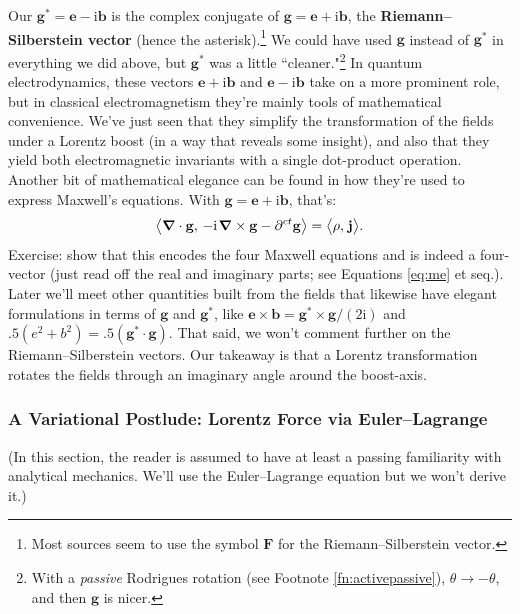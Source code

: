 \documentclass[12pt]{article}
\renewcommand{\vv}[1]{\mathbf{#1}}
\newcommand{\del}{\boldsymbol{\nabla}}
\begin{document}
Our $\vv g^{*} = \vv e - \textrm{i} \vv b$ is the complex conjugate of $\vv g = \vv e + \textrm{i} \vv b$, the \textbf{Riemann--Silberstein vector} (hence the asterisk).\footnote{Most sources seem to use the symbol $\vv F$ for the Riemann--Silberstein vector.} We could have used $\vv g$ instead of $\vv g^*$ in everything we did above, but $\vv g^*$ was a little ``cleaner."\footnote{With a \emph{passive} Rodrigues rotation (see Footnote \ref{fn:activepassive}), $\theta \rightarrow - \theta$, and then $\vv g$ is nicer.} In quantum electrodynamics, these vectors $\vv e + \textrm{i} \vv b$ and $\vv e - \textrm{i} \vv b$ take on a more prominent role, but in classical electromagnetism they're mainly tools of mathematical convenience. We've just seen that they simplify the transformation of the fields under a Lorentz boost (in a way that reveals some insight), and also that they yield both electromagnetic invariants with a single dot-product operation. Another bit of mathematical elegance can be found in how they're used to express Maxwell's equations. With $\vv g = \vv e + \textrm{i} \vv b$, that's:
\begin{equation*}
\big \langle \del \cdot \vv g, \, - \textrm{i} \mkern2mu \del \times \vv g - \partial^{ct} \vv g \big \rangle = \big \langle \rho, \mkern2mu \vv j \big \rangle .
\end{equation*}
Exercise: show that this encodes the four Maxwell equations and is indeed a four-vector (just read off the real and imaginary parts; see Equations \ref{eq:me} et seq.). Later we'll meet other quantities built from the fields that likewise have elegant formulations in terms of $\vv g$ and $\vv g^*$, like $\vv e \times \vv b = \vv g^* \times \vv g / (2 \textrm{i})$ and ${.5( e^2 + b^2 ) = .5 ( \vv g^*  \cdot \vv g)}$. That said, we won't comment further on the Riemann--Silberstein vectors. Our takeaway is that a Lorentz transformation rotates the fields through an imaginary angle around the boost-axis.


\subsubsection{A Variational Postlude: Lorentz Force via Euler--Lagrange}\label{sssec:ele}

(In this section, the reader is assumed to have at least a passing familiarity with analytical mechanics. We'll use the Euler--Lagrange equation but we won't derive it.)
\end{document}
